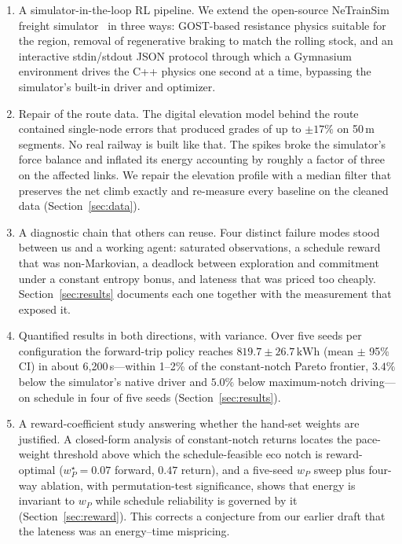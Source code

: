 \documentclass[11pt,a4paper]{article}
\newcommand{\kwh}{\,\text{kWh}}   %
\begin{document}
\begin{enumerate}
  \item A simulator-in-the-loop RL pipeline. We extend the open-source
  NeTrainSim freight simulator~\cite{aredah2024} in three ways:
  GOST-based resistance physics suitable for the region, removal of
  regenerative braking to match the rolling stock, and an interactive
  stdin/stdout JSON protocol through which a Gymnasium environment drives
  the C++ physics one second at a time, bypassing the simulator's
  built-in driver and optimizer.

  \item Repair of the route data. The digital elevation model behind the
  route contained single-node errors that produced grades of up to
  $\pm17\%$ on 50\,m segments. No real railway is built like that. The
  spikes broke the simulator's force balance and inflated its energy
  accounting by roughly a factor of three on the affected links. We
  repair the elevation profile with a median filter that preserves the
  net climb exactly and re-measure every baseline on the cleaned data
  (Section~\ref{sec:data}).

  \item A diagnostic chain that others can reuse. Four distinct failure
  modes stood between us and a working agent: saturated observations, a
  schedule reward that was non-Markovian, a deadlock between exploration
  and commitment under a constant entropy bonus, and lateness that was
  priced too cheaply. Section~\ref{sec:results} documents each one
  together with the measurement that exposed it.

  \item Quantified results in both directions, with variance. Over five
  seeds per configuration the forward-trip policy reaches
  $819.7\pm26.7\kwh$ (mean $\pm$ 95\% CI) in about 6{,}200\,s---within
  1--2\% of the constant-notch Pareto frontier, $3.4\%$ below the
  simulator's native driver and $5.0\%$ below maximum-notch driving---on
  schedule in four of five seeds (Section~\ref{sec:results}).

  \item A reward-coefficient study answering whether the hand-set weights
  are justified. A closed-form analysis of constant-notch returns locates
  the pace-weight threshold above which the schedule-feasible eco notch is
  reward-optimal ($w_P^\star=0.07$ forward, $0.47$ return), and a five-seed
  $w_P$ sweep plus four-way ablation, with permutation-test significance,
  shows that energy is invariant to $w_P$ while schedule reliability is
  governed by it (Section~\ref{sec:reward}). This corrects a conjecture
  from our earlier draft that the lateness was an energy--time mispricing.
\end{enumerate}
\end{document}
